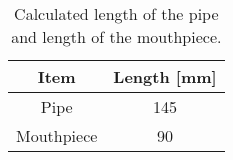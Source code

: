 \setlength{\abovecaptionskip}{0pt}
\vspace{0.1cm}
{\renewcommand{\arraystretch}{1.5}
\begin{table}[h!]
    \begin{center}
        \small
        \begin{tabular}{ | c | c | }
            \hline
            \textbf{Item}  &  \textbf{Length [mm]}  \\
            \hline
                Pipe  &  145  \\
                \hline
                \rowcolor{Gray}
                Mouthpiece  &  90  \\
            \hline
        \end{tabular}
    \end{center}
    \caption{Calculated length of the pipe and length of the mouthpiece.}
    \label{table:mouthpieceAndPip}
\end{table}


%
%


}
